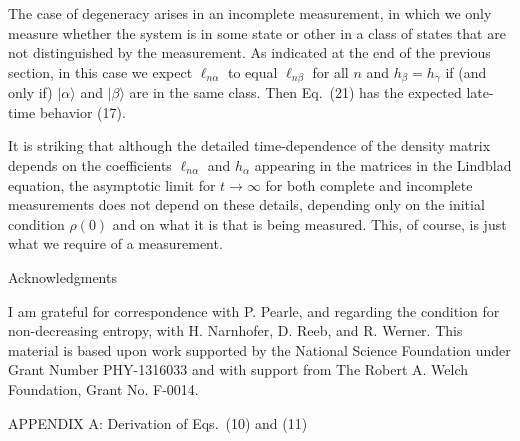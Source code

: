 The case of degeneracy arises in an incomplete measurement, in which  we only measure whether the system is in some state or other in a class  of states that are not distinguished by the measurement.  As indicated at the end of the previous section, in this case we expect $\ell_{n\alpha}$ to equal $\ell_{n\beta}$ for all $n$ and $h_\beta=h_\gamma$ if (and only if) $|\alpha\rangle$ and $|\beta\rangle$ are in the same class.  Then Eq.~(21) has the expected late-time behavior (17).


It is striking that although the detailed time-dependence of the density matrix depends on the coefficients $\ell_{n\alpha}$ and $h_\alpha$ appearing in the matrices in the Lindblad equation, the asymptotic limit for $t\rightarrow\infty$ for both complete and incomplete measurements does not depend on these details, depending only on the initial condition $\rho(0)$ and on what it is that  is being measured.  
This, of course, is just what we require of a measurement. 



\vspace{20pt}

\begin{center}
Acknowledgments
\end{center}

I am grateful for correspondence with P. Pearle, and regarding the condition for non-decreasing entropy, with H. Narnhofer,  D. Reeb, and R. Werner.  This material is based upon work supported by the National Science Foundation under Grant Number PHY-1316033 and with support from The Robert A. Welch Foundation, Grant No. F-0014.


\vspace{10pt}

\begin{center}
{APPENDIX A: Derivation of Eqs.~(10) and (11) }
\end{center}
\renewcommand{\theequation}{A.\arabic{equation}}
\setcounter{equation}{0}

